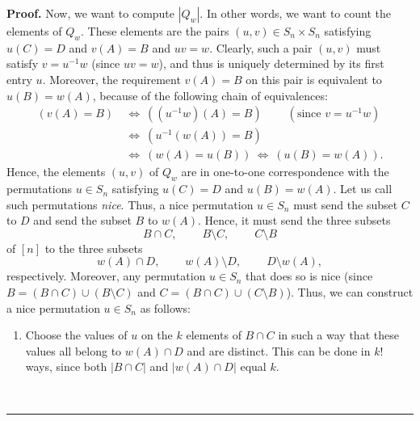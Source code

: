 \documentclass[numbers=enddot,12pt,final,onecolumn,notitlepage]{scrartcl}%
\numberwithin{exer}{subsection}
\theoremstyle{definition}
\newenvironment{proof}[1][Proof]{\noindent\textbf{#1.} }{\ \rule{0.5em}{0.5em}}
\begin{document}
\begin{proof}
Now, we want to compute $\left\vert Q_{w}\right\vert $. In other words, we
want to count the elements of $Q_{w}$. These elements are the pairs $\left(
u,v\right)  \in S_{n}\times S_{n}$ satisfying $u\left(  C\right)  =D$ and
$v\left(  A\right)  =B$ and $uv=w$. Clearly, such a pair $\left(  u,v\right)
$ must satisfy $v=u^{-1}w$ (since $uv=w$), and thus is uniquely determined by
its first entry $u$. Moreover, the requirement $v\left(  A\right)  =B$ on this
pair is equivalent to $u\left(  B\right)  =w\left(  A\right)  $, because of
the following chain of equivalences:%
\begin{align*}
\left(  v\left(  A\right)  =B\right)  \  &  \Longleftrightarrow\ \left(
\left(  u^{-1}w\right)  \left(  A\right)  =B\right)
\ \ \ \ \ \ \ \ \ \ \left(  \text{since }v=u^{-1}w\right) \\
&  \Longleftrightarrow\ \left(  u^{-1}\left(  w\left(  A\right)  \right)
=B\right) \\
&  \Longleftrightarrow\ \left(  w\left(  A\right)  =u\left(  B\right)
\right)  \ \Longleftrightarrow\ \left(  u\left(  B\right)  =w\left(  A\right)
\right)  .
\end{align*}
Hence, the elements $\left(  u,v\right)  $ of $Q_{w}$ are in one-to-one
correspondence with the permutations $u\in S_{n}$ satisfying $u\left(
C\right)  =D$ and $u\left(  B\right)  =w\left(  A\right)  $. Let us call such
permutations \emph{nice}. Thus, a nice permutation $u\in S_{n}$ must send the
subset $C$ to $D$ and send the subset $B$ to $w\left(  A\right)  $. Hence, it
must send the three subsets%
\[
B\cap C,\ \ \ \ \ \ \ \ \ \ B\setminus C,\ \ \ \ \ \ \ \ \ \ C\setminus B
\]
of $\left[  n\right]  $ to the three subsets%
\[
w\left(  A\right)  \cap D,\ \ \ \ \ \ \ \ \ \ w\left(  A\right)  \setminus
D,\ \ \ \ \ \ \ \ \ \ D\setminus w\left(  A\right)  ,
\]
respectively. Moreover, any permutation $u\in S_{n}$ that does so is nice
(since $B=\left(  B\cap C\right)  \cup\left(  B\setminus C\right)  $ and
$C=\left(  B\cap C\right)  \cup\left(  C\setminus B\right)  $). Thus, we can
construct a nice permutation $u\in S_{n}$ as follows:

\begin{enumerate}
\item Choose the values of $u$ on the $k$ elements of $B\cap C$ in such a way
that these values all belong to $w\left(  A\right)  \cap D$ and are distinct.
This can be done in $k!$ ways, since both $\left\vert B\cap C\right\vert $ and
$\left\vert w\left(  A\right)  \cap D\right\vert $ equal $k$.


\end{enumerate}
\end{proof}
\end{document}
